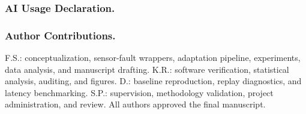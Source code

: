 \documentclass[runningheads]{llncs}
\begin{document}
{\small\subsubsection*{AI Usage Declaration.}
\par}

{\small\subsubsection*{Author Contributions.}
F.S.: conceptualization, sensor-fault wrappers, adaptation pipeline, experiments, data analysis, and manuscript drafting. K.R.: software verification, statistical analysis, auditing, and figures. D.: baseline reproduction, replay diagnostics, and latency benchmarking. S.P.: supervision, methodology validation, project administration, and review. All authors approved the final manuscript.\par}

\let\oldthebibliography\thebibliography
\let\endoldthebibliography\endthebibliography
\renewenvironment{thebibliography}[1]{%
  \begin{oldthebibliography}{#1}%
    \setlength{\itemsep}{0pt plus 0.2pt}%
    \setlength{\parskip}{0pt}%
}{%
  \end{oldthebibliography}%
}

\end{document}
